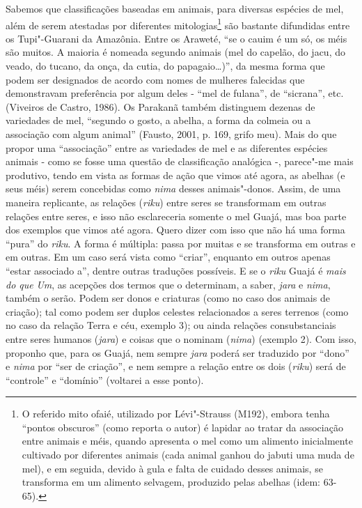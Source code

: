 Sabemos que classificações baseadas em animais, para diversas espécies
de mel, além de serem atestadas por diferentes mitologias\footnote{O
  referido mito ofaié, utilizado por Lévi"-Strauss (M192), embora tenha
  ``pontos obscuros'' (como reporta o autor) é lapidar ao tratar da
  associação entre animais e méis, quando apresenta o mel como um
  alimento inicialmente cultivado por diferentes animais (cada animal
  ganhou do jabuti uma muda de mel), e em seguida, devido à gula e falta
  de cuidado desses animais, se transforma em um alimento selvagem,
  produzido pelas abelhas (idem: 63-65).} são bastante difundidas entre
os Tupi"-Guarani da Amazônia. Entre os Araweté, ``se o cauim é um só, os
méis são muitos. A maioria é nomeada segundo animais (mel do capelão, do
jacu, do veado, do tucano, da onça, da cutia, do papagaio\ldots{})'', da mesma
forma que podem ser designados de acordo com nomes de mulheres falecidas
que demonstravam preferência por algum deles - ``mel de fulana'', de
``sicrana'', etc. (Viveiros de Castro, 1986). Os Parakanã também
distinguem dezenas de variedades de mel, ``segundo o gosto, a abelha, a
forma da colmeia ou a associação com algum animal'' (Fausto, 2001, p.
169, grifo meu). Mais do que propor uma ``associação'' entre as variedades
de mel e as diferentes espécies animais - como se fosse uma questão de
classificação analógica -, parece"-me mais produtivo, tendo em vista as
formas de ação que vimos até agora, as abelhas (e seus méis) serem
concebidas como \emph{nima} desses animais"-donos. Assim, de uma maneira
replicante, as relações (\emph{riku}) entre seres se transformam em
outras relações entre seres, e isso não esclareceria somente o mel
Guajá, mas boa parte dos exemplos que vimos até agora. Quero dizer com
isso que não há uma forma ``pura'' do \emph{riku}. A forma é múltipla:
passa por muitas e se transforma em outras e em outras. Em um caso será
vista como ``criar'', enquanto em outros apenas ``estar associado a'',
dentre outras traduções possíveis. E se o \emph{riku} Guajá é \emph{mais
do que} \emph{Um}, as acepções dos termos que o determinam, a saber,
\emph{jara} e \emph{nima}, também o serão. Podem ser donos e criaturas
(como no caso dos animais de criação); tal como podem ser duplos
celestes relacionados a seres terrenos (como no caso da relação Terra e
céu, exemplo 3); ou ainda relações consubstanciais entre seres humanos
(\emph{jara}) e coisas que o nominam (\emph{nima}) (exemplo 2). Com
isso, proponho que, para os Guajá, nem sempre \emph{jara} poderá ser
traduzido por ``dono'' e \emph{nima} por ``ser de criação'', e nem sempre a
relação entre os dois (\emph{riku}) será de ``controle'' e ``domínio''
(voltarei a esse ponto).

